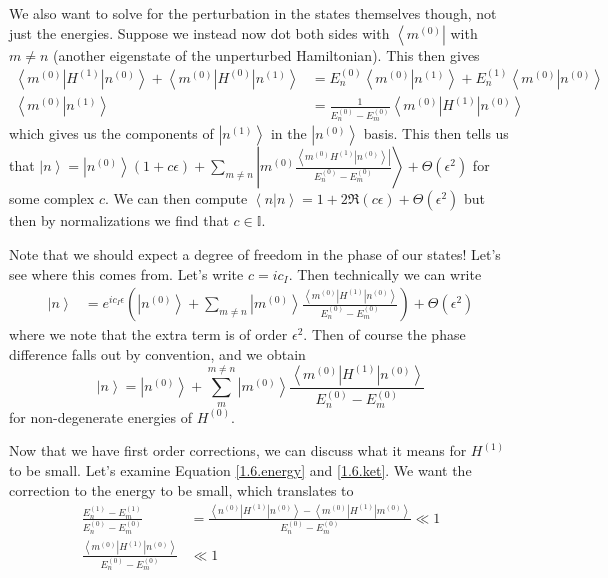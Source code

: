 \documentclass[10pt]{report}
\newcommand{\bra}[1]{\left<#1\right|}
\newcommand{\ket}[1]{\left|#1\right>}
\newcommand{\dotp}[2]{\left<#1\left.\right|#2\right>}
\begin{document}
We also want to solve for the perturbation in the states themselves though, not just the energies. Suppose we instead now dot both sides with $\bra{m^{(0)}}$ with $m \neq n$ (another eigenstate of the unperturbed Hamiltonian). This then gives
\begin{align}
    \bra{m^{(0)}}H^{(1)}\ket{n^{(0)}} + \bra{m^{(0)}}H^{(0)}\ket{n^{(1)}} &= E_n^{(0)}\dotp{m^{(0)}}{n^{(1)}}+ E_n^{(1)}\dotp{m^{(0)}}{n^{(0)}}\\
    \dotp{m^{(0)}}{n^{(1)}} &= \frac{1}{E_n^{(0)} - E_{m}^{(0)}}\bra{m^{(0)}}H^{(1)}\ket{n^{(0)}}
\end{align}
which gives us the components of $\ket{n^{(1)}}$ in the $\ket{n^{(0)}}$ basis. This then tells us that $\ket{n} = \ket{n^{(0)}}\left( 1 + c\epsilon \right) + \sum_{m \neq n} \ket{m^{(0)}\frac{\bra{m^{(0)}H^{(1)}\ket{n^{(0)}}}}{E_n^{(0)} - E_m^{(0)}}}+ \Theta(\epsilon^2)$ for some complex $c$. We can then compute $\dotp{n}{n} = 1 + 2\Re(c\epsilon) + \Theta(\epsilon^2)$ but then by normalizations we find that $c \in \mathbb{I}$. 

Note that we should expect a degree of freedom in the phase of our states! Let's see where this comes from. Let's write $c = ic_I$. Then technically we can write
\begin{align}
    \ket{n} &= e^{ic_I\epsilon}\left( \ket{n^{(0)}} + \sum_{m \neq n} \ket{m^{(0)}}\frac{\bra{m^{(0)}}H^{(1)}\ket{n^{(0)}}}{E_n^{(0)} - E_m^{(0)}} \right) + \Theta(\epsilon^2)
\end{align}
where we note that the extra term is of order $\epsilon^2$. Then of course the phase difference falls out by convention, and we obtain
\begin{equation}
    \ket{n} = \ket{n^{(0)}} + \sum_{m}^{m \neq n} \ket{m^{(0)}}\frac{\bra{m^{(0)}}H^{(1)}\ket{n^{(0)}}}{E_n^{(0)} - E_m^{(0)}}
    \label{1.6.ket}
\end{equation}
for non-degenerate energies of $H^{(0)}$. 

Now that we have first order corrections, we can discuss what it means for $H^{(1)}$ to be small. Let's examine Equation \ref{1.6.energy} and \ref{1.6.ket}. We want the correction to the energy to be small, which translates to
\begin{align}
    \frac{E_n^{(1)} - E_m^{(1)}}{E_n^{(0)} - E_m^{(0)}} &= \frac{\bra{n^{(0)}}H^{(1)}\ket{n^{(0)}} - \bra{m^{(0)}}H^{(1)}\ket{m^{(0)}}}{E_n^{(0)} - E_m^{(0)}} \ll 1\\
    \frac{\bra{m^{(0)}}H^{(1)}\ket{n^{(0)}}}{E_n^{(0)}-E_m^{(0)}} &\ll 1
    \label{1.6.small}
\end{align}
\end{document}
